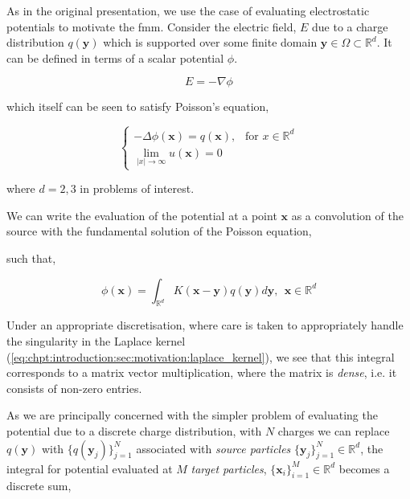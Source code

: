 As in the original presentation, we use the case of evaluating electrostatic potentials to motivate the \acrshort{fmm}. Consider the electric field, $E$ due to a charge distribution $q(\mathbf{y})$ which is supported over some finite domain $\mathbf{y} \in \Omega \subset \mathbb{R}^d$. It can be defined in terms of a scalar potential $\phi$.

\begin{equation*}
E = -\nabla \phi
\end{equation*}

which itself can be seen to satisfy Poisson's equation,

\begin{equation*}
    \begin{cases}
        - \Delta \phi(\mathbf{x}) = q(\mathbf{x}), \> \> \text{  for } x\in \mathbb{R}^d \\
        \underset{|x| \rightarrow \infty}{\lim } u(\mathbf{x}) = 0
    \end{cases}
\end{equation*}


where $d=2,3$ in problems of interest.

We can write the evaluation of the potential at a point $\mathbf{x}$ as a convolution of the source with the fundamental solution of the Poisson equation,

such that,

\begin{equation}
\phi(\mathbf{x}) = \int_{\mathbb{R}^d} K(\mathbf{x-y})q(\mathbf{y}) d\mathbf{y}, \> \> \mathbf{x} \in \mathbb{R}^d
\end{equation}\label{eq:chpt:fmm:laplace_potential_integral}

Under an appropriate discretisation, where care is taken to appropriately handle the singularity in the Laplace kernel (\ref{eq:chpt:introduction:sec:motivation:laplace_kernel}), we see that this integral corresponds to a matrix vector multiplication, where the matrix is \textit{dense}, i.e. it consists of non-zero entries.

As we are principally concerned with the simpler problem of evaluating the potential due to a discrete charge distribution, with $N$ charges we can replace $q(\mathbf{y})$ with $\{ q(\mathbf{y}_j) \}_{j=1}^N$ associated with \textit{source particles} $\{\mathbf{y}_j\}_{j=1}^N \in \mathbb{R}^d$, the integral for potential evaluated at $M$ \textit{target particles}, $\{\mathbf{x}_i \}_{i=1}^M \in \mathbb{R}^d$ becomes a discrete sum,


